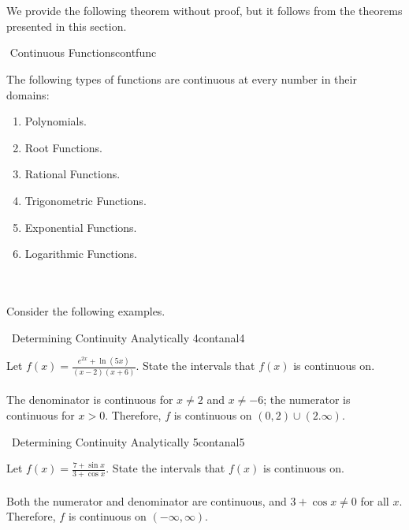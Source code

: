         \vphantom
        \\
        \\
        We provide the following theorem without proof, but it follows from the theorems presented in this section.
        \begin{theorem}{\Stop\,\,Continuous Functions}{contfunc}

            The following types of functions are continuous at every number in their domains:
            \begin{enumerate}
                \item Polynomials.
                \item Root Functions.
                \item Rational Functions.
                \item Trigonometric Functions.
                \item Exponential Functions.
                \item Logarithmic Functions.
            \end{enumerate}
            
        \end{theorem}
        \vphantom
        \\
        \\
        Consider the following examples.
        \begin{example}{\Difficulty\,\Difficulty\,\,Determining Continuity Analytically 4}{contanal4}

            Let \(f(x)=\frac{e^{2x}+\ln(5x)}{(x-2)(x+6)}\).
            State the intervals that \(f(x)\) is continuous on.
            \\
            \\
            The denominator is continuous for \(x\neq2\) and \(x\neq-6\); the numerator is continuous for \(x>0\). Therefore, \(f\) is continuous on \((0,2)\cup(2.\infty)\).

        \end{example}
        \pagebreak
        \begin{example}{\Difficulty\,\Difficulty\,\,Determining Continuity Analytically 5}{contanal5}

            Let \(f(x)=\frac{7+\sin x}{3+\cos x}\).
            State the intervals that \(f(x)\) is continuous on.
            \\
            \\
            Both the numerator and denominator are continuous, and \(3+\cos x\neq 0\) for all \(x\). Therefore, \(f\) is continuous on \((-\infty,\infty)\). 

        \end{example}
